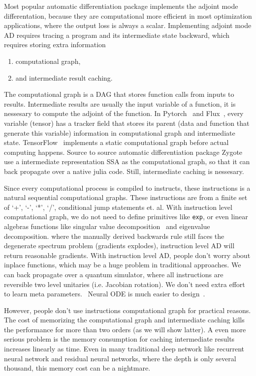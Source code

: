 \documentclass{article}
\newcommand{\<}{\langle}
\renewcommand{\>}{\rangle}
\begin{document}
Most popular automatic differentiation package implements the adjoint mode differentation, because they are computational more efficient in most optimization applications, where the output loss is always a scalar.
Implementing adjoint mode AD requires tracing a program and its intermediate state backward, which requires storing extra information
\begin{enumerate}
    \item computational graph,
    \item and intermediate result caching.
\end{enumerate}
The computational graph is a DAG that stores function calls from inputs to results. Intermediate results are usually the input variable of a function, it is nessesary to compute the adjoint of the function.
In Pytorch~\cite{Paszke2017} and Flux~\cite{FluxPaper}, every variable (tensor) has a tracker field that stores its parent (data and function that generate this variable) information in computational graph and intermediate state. TensorFlow~\cite{Tensorflow2015} implements a static computational graph before actual computing happens.
Source to source automatic differentiation package Zygote~\cite{Innes2019} use a intermediate representation SSA as the computational graph, so that it can back propagate over a native julia code. Still, intermediate caching is nessesary.

Since every computational process is compiled to instructs, these instructions is a natural sequential computational graphs. These instructions are from a finite set of `+', `-', `*', `/', conditional jump statements et. al. With instruction level computational graph, we do not need to define primitives like \texttt{exp}, or even linear algebras functions like singular value decomposition~\cite{} and eigenvalue decomposition. where the manually derived backwards rule still faces the degenerate spectrum problem (gradients explodes), instruction level AD will return reasonable gradients. With instruction level AD, people don't worry about inplace functions, which may be a huge problem in traditional approaches. We can back propagate over a quantum simulator, where all instructions are reversible two level unitaries (i.e. Jacobian rotation).
We don't need extra effort to learn meta parameters.~\cite{} Neural ODE is much easier to design~\cite{Chen2018}.

However, people don't use instructions computational graph for practical reasons. The cost of memorizing the computational graph and intermediate caching kills the performance for more than two orders (as we will show latter).
A even more serious problem is the memory consumption for caching intermediate results increases linearly as time. Even in many traditional deep network like recurrent neural network and residual neural networks, where the depth is only several thousand, this memory cost can be a nightmare.
\end{document}
